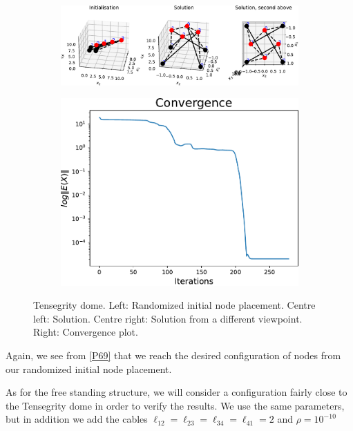 \begin{figure}[!ht]
\centering
\begin{subfigure}{.72\textwidth}
  \centering
  \includegraphics[width=0.99\linewidth]{Bilder/P69.pdf}
\end{subfigure}%
\begin{subfigure}{.3\textwidth}
  \centering
  \includegraphics[width=0.99\linewidth]{Bilder/P69conv.pdf}
\end{subfigure}
\caption{Tensegrity dome. Left: Randomized initial node placement. Centre left: Solution. Centre right: Solution from a different viewpoint. Right: Convergence plot.}
\label{P69}
\end{figure}

Again, we see from \eqref{P69} that we reach the desired configuration of nodes from our randomized initial node placement. 


As for the free standing structure, we will consider a configuration fairly close to the Tensegrity dome in order to verify the results. We use the same parameters, but in addition we add the cables 
$\ell_{12} = \ell_{23} = \ell_{34} = \ell_{41} = 2 $ and $\rho = 10^{-10}$

